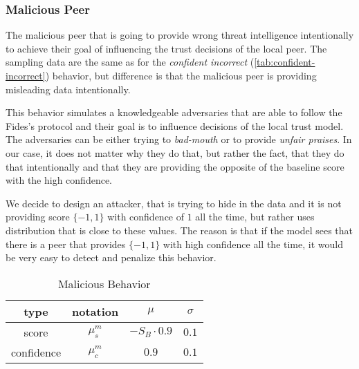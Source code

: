 \subsubsection{Malicious Peer}
\label{subsubsec:malicious-peer}
The malicious peer that is going to provide wrong threat intelligence intentionally to achieve their goal of influencing the trust decisions of the local peer. 
The sampling data are the same as for the \textit{confident incorrect} (\ref{tab:confident-incorrect}) behavior, but difference is that the malicious peer is providing misleading data intentionally.

This behavior simulates a knowledgeable adversaries that are able to follow the Fides's protocol and their goal is to influence decisions of the local trust model.
The adversaries can be either trying to \textit{bad-mouth} or to provide \textit{unfair praises}.
In our case, it does not matter why they do that, but rather the fact, that they do that intentionally and that they are providing the opposite of the baseline score with the high confidence.

We decide to design an attacker, that is trying to hide in the data and it is not providing score $\{-1, 1\}$ with confidence of $1$ all the time, but rather uses distribution that is close to these values.
The reason is that if the model sees that there is a peer that provides $\{-1, 1\}$ with high confidence all the time, it would be very easy to detect and penalize this behavior.

\begin{table}[!ht]
    \centering
    \begin{tabular}{c|c|c|c}
        type & notation & $\mu$ & $\sigma$ \\
        \hline
        score & $\mu^{m}_{s}$ & $-S_{B} \cdot 0.9$ & $0.1$ \\
        confidence & $\mu^{m}_{c}$ &  $0.9$ & $0.1$ \\
    \end{tabular}
    \caption{Malicious Behavior}
    \label{tab:malicious-peer}
\end{table}

